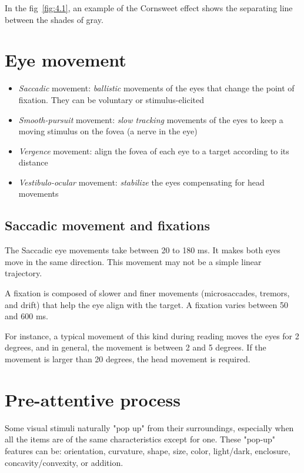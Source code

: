 In the fig~\ref{fig:4.1}, an example of the Cornsweet effect shows the separating line between the shades of gray.

\section{Eye movement}
\begin{itemize}[noitemsep]
    \item \emph{Saccadic} movement: \emph{ballistic} movements of the eyes that change the point of fixation. They can be voluntary or stimulus-elicited
    \item \emph{Smooth-pursuit} movement: \emph{slow tracking} movements of the eyes to keep a moving stimulus on the fovea (a nerve in the eye)
    \item \emph{Vergence} movement: align the fovea of each eye to a target according to its distance
    \item \emph{Vestibulo-ocular} movement: \emph{stabilize} the eyes compensating for head movements
\end{itemize}

\subsection{Saccadic movement and fixations}
The Saccadic eye movements take between 20 to 180 ms. It makes both eyes move in the same direction. This movement may not be a simple linear trajectory.

\begin{definition}[Fixation]
    A fixation is composed of slower and finer movements (microsaccades, tremors, and drift) that help the eye align with the target. A fixation varies between 50 and 600 ms.
\end{definition}

For instance, a typical movement of this kind during reading moves the eyes for 2 degrees, and in general, the movement is between 2 and 5 degrees. If the movement is larger than 20 degrees, the head movement is required.

\section{Pre-attentive process}
Some visual stimuli naturally "pop up" from their surroundings, especially when all the items are of the same characteristics except for one. These "pop-up" features can be: orientation, curvature, shape, size, color, light/dark, enclosure, concavity/convexity, or addition. 

